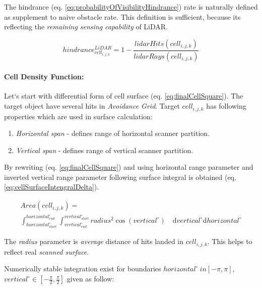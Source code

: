 \noindent The hindrance (eq. \ref{eq:probabilityOfVisibilityHindrance}) rate is naturally defined as supplement to naive obstacle rate. This definition is sufficient, because its reflecting the \emph{remaining sensing capability} of  LiDAR.

\begin{equation}\label{eq:probabilityOfVisibilityHindrance}
    hindrance^{LiDAR}_{cell_{i,j,k}}=1-\frac{lidar Hits(cell_{i,j,k})}{lidar Rays(cell_{i,j,k})}
\end{equation}

\paragraph{Cell Density Function:}  Let`s start with differential form of cell surface (eq. \ref{eq:finalCellSquare}). The target object have several hits in \emph{Avoidance Grid}. Target $cell_{i,j,k}$ has following properties which are used in surface calculation:
\begin{enumerate}
    \item \textit{Horizontal span} - defines range of horizontal scanner partition.
    \item \textit{Vertical span} - defines range of vertical scanner partition.
\end{enumerate}

\noindent By rewriting (eq. \ref{eq:finalCellSquare}) and using horizontal range parameter and inverted vertical range parameter following surface integral is obtained (eq. \ref{eq:cellSurfaceIntengralDelta}).

\begin{multline}\label{eq:cellSurfaceIntengralDelta}
    Area(cell_{i,j,k}) =\\ \int_{horizontal_{start}^\circ}^{horizontal_{end}^\circ}\int_{vertical_{end}^\circ}^{vertical_{start}^\circ} radius^2 \cos(vertical^\circ) \quad \text{d} vertical^
    \circ\text{d} horizontal^\circ
\end{multline}

\begin{note}
    The \emph{radius} parameter is \emph{average} distance of hits landed in $cell_{i,j,k}$. This helps to reflect real \emph{scanned surface}.
\end{note}

\noindent Numerically stable integration exist for boundaries $horizontal^\circ \ in [-\pi,\pi]$, $vertical^\circ \in [-\frac{\pi}{2},\frac{\pi}{2}]$ given as follow:

